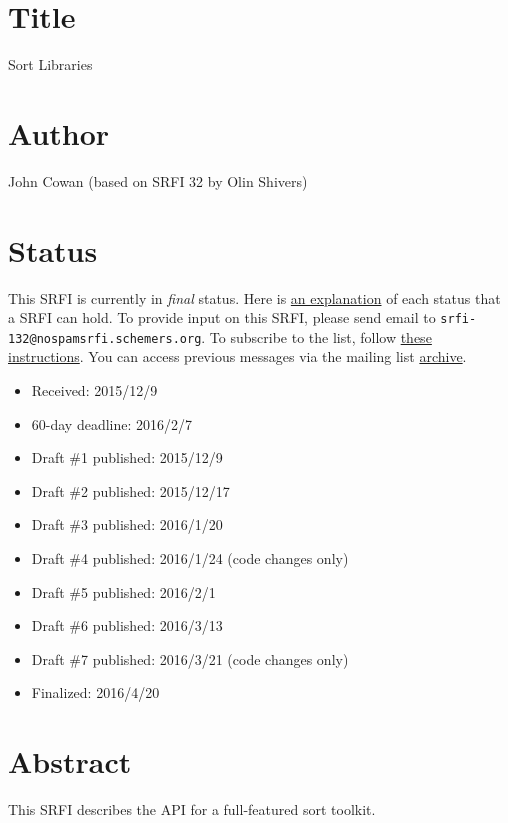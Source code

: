 \section{Title}\label{title}

Sort Libraries

\section{Author}\label{author}

John Cowan (based on SRFI 32 by Olin Shivers)

\section{Status}\label{status}

This SRFI is currently in \emph{final} status. Here is
\href{http://srfi.schemers.org/srfi-process.html}{an explanation} of
each status that a SRFI can hold. To provide input on this SRFI, please
send email to \texttt{srfi-132@nospamsrfi.schemers.org}. To subscribe to
the list, follow
\href{http://srfi.schemers.org/srfi-list-subscribe.html}{these
instructions}. You can access previous messages via the mailing list
\href{http://srfi-email.schemers.org/srfi-132}{archive}.

\begin{itemize}
\tightlist
\item
  Received: 2015/12/9
\item
  60-day deadline: 2016/2/7
\item
  Draft \#1 published: 2015/12/9
\item
  Draft \#2 published: 2015/12/17
\item
  Draft \#3 published: 2016/1/20
\item
  Draft \#4 published: 2016/1/24 (code changes only)
\item
  Draft \#5 published: 2016/2/1
\item
  Draft \#6 published: 2016/3/13
\item
  Draft \#7 published: 2016/3/21 (code changes only)
\item
  Finalized: 2016/4/20
\end{itemize}

\section{Abstract}\label{abstract}

This SRFI describes the API for a full-featured sort toolkit.

